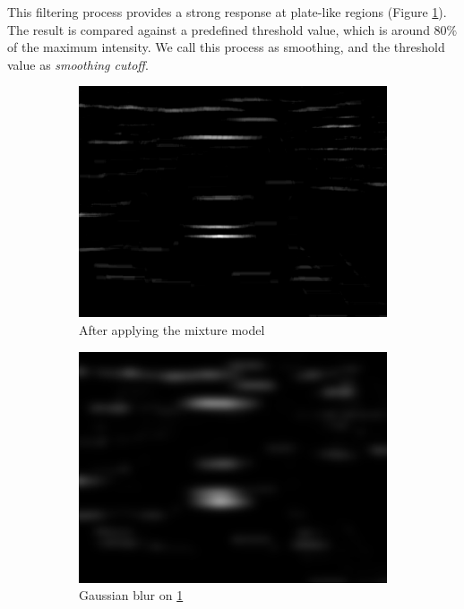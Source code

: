 \documentclass{standalone}
\begin{document}
This filtering process provides a strong response at plate-like regions (Figure \ref{fig:OriginalMixtureModel}). The result is compared against a predefined threshold value, which is around $80\%$ of the maximum intensity. We call this process as smoothing, and the threshold value as {\it smoothing cutoff}.

\begin{figure}
\begin{subfigure}{.5\textwidth}
  \centering
  \includegraphics[width=.8\linewidth]{./img/sample/stage5-4.jpg}
  \caption{After applying the mixture model}
  \label{fig:OriginalMixtureModel}
\end{subfigure}
\begin{subfigure}{.5\textwidth}
  \centering
  \includegraphics[width=.8\linewidth]{./img/sample/stage5-3.jpg}
  \caption{Gaussian blur on \ref{fig:OriginalMixtureModel}}
  \label{fig:BlurredMixtureModel}
\end{subfigure}
\begin{subfigure}{.5\textwidth}
  \centering

\end{subfigure}
\end{figure}
\end{document}
